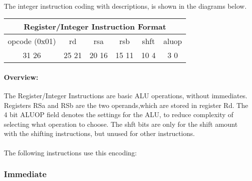 \documentclass[letterpaper, 11pt]{article}
\begin{document}
\paragraph{}The integer instruction coding with descriptions, is shown in the diagrams below.

\begin{center}
		\begin{tabular}{|c|c|c|c|c|c|}
			\multicolumn{6}{c}{Register/Integer Instruction Format}\\ \hline
				\hspace{2pt} opcode (0x01) \hspace{2pt} & \hspace{5pt} rd \hspace{5pt} &  \hspace{4pt} rsa \hspace{4pt} & \hspace{4pt}rsb  \hspace{4pt}& \hspace{10pt}shft  \hspace{10pt} & \hspace{3pt} aluop \hspace{3pt}   \\	\hline
			31 \hfill 26& 25 \hfill 21 &20 \hfill  16& 15 \hfill  11&10 \hfill   4&3 \hfill   0\\ \hline
		
	\end{tabular}
\end{center}	
\paragraph{Overview:}The Register/Integer Instructions are basic ALU operations, without immediates. Registers RSa and RSb are the two operands,which
are stored in register Rd. The 4 bit ALUOP field denotes the settings for the ALU, to reduce complexity of selecting what operation to choose.
The shft bits are only for the shift amount with the shifting instructions, but unused for other instructions. 
\paragraph{}The following instructions use this encoding:



\subsubsection{Immediate}
\end{document}
